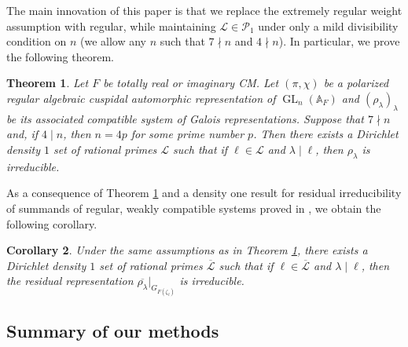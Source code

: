 \documentclass{amsart}
\newtheorem{theorem}{Theorem}[section]
\newtheorem{corollary}[theorem]{Corollary}
\theoremstyle{definition}
\numberwithin{equation}{section} %
\newcommand{\GL}{\operatorname{GL}}
\newcommand{\bb}[1]{\mathbb{#1}}
\newcommand{\mc}[1]{\mathcal{#1}}
\begin{document}
The main innovation of this paper is that we replace the extremely regular weight assumption with regular, while maintaining \( \mc{L}\in\mc{P}_1 \) under only a mild divisibility condition on \( n \) (we allow any \( n \) such that \( 7\nmid n \) and \( 4\nmid n \)). In particular, we prove the following theorem.


\begin{theorem} \label{thm: intro main theorem}
    Let \( F \) be totally real or imaginary CM. Let \( (\pi,\chi) \) be a polarized regular algebraic cuspidal automorphic representation of \( \GL_n(\bb{A}_F) \) and \( (\rho_\lambda)_\lambda \) be its associated compatible system of Galois representations. Suppose that \( 7\nmid n \) and, if \( 4\mid n \), then $n = 4p$ for some prime number $p$.
    Then there exists a Dirichlet density \( 1 \) set of rational primes \( \mc{L} \) such that if \( \ell \in \mc{L} \) and \( \lambda\mid\ell\), then \( \rho_\lambda \) is irreducible.
\end{theorem}


As a consequence of Theorem \ref{thm: intro main theorem} and a density one result for residual irreducibility of summands of regular, weakly compatible systems proved in \cite{BLGGT14}, we obtain the following corollary.

\begin{corollary} \label{cor: intro residual irreducibility}
Under the same assumptions as in Theorem \ref{thm: intro main theorem}, there exists a Dirichlet density \( 1 \) set of rational primes \( \overline{\mc{L}} \) such that if \( \ell \in \overline{\mc{L}} \) and \( \lambda\mid\ell\), then the residual representation \( \overline{\rho_\lambda}|_{G_{F(\zeta_\ell)}} \) is irreducible.
\end{corollary}

\subsection{Summary of our methods}
\end{document}
